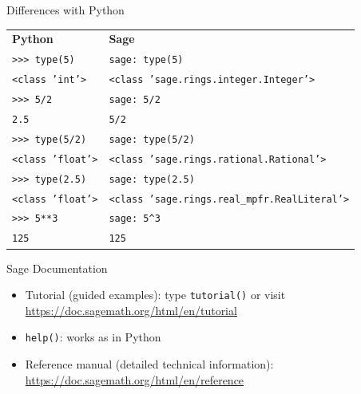 \documentclass[11pt]{beamer}
\begin{document}
\begin{frame}{Differences with Python}
  \begin{tabular}{l|l}
    \textbf{Python} & \textbf{Sage}                                          \\
    \texttt{{\color{gray}>>>} {\color{blue}type(5)}} &
    \texttt{{\color{gray}sage:} {\color{blue}type(5)}}                       \\
    \texttt{<class 'int'>} & \texttt{<class 'sage.rings.integer.Integer'>}   \\
    \texttt{{\color{gray}>>>} {\color{blue}5/2}} &
    \texttt{{\color{gray}sage:} {\color{blue}5/2}}                           \\
    \texttt{2.5} & \texttt{5/2}                                              \\
    \texttt{{\color{gray}>>>} {\color{blue}type(5/2)}} &
    \texttt{{\color{gray}sage:} {\color{blue}type(5/2)}}                     \\
    \texttt{<class 'float'>} &
    \texttt{<class 'sage.rings.rational.Rational'>}                          \\
    \texttt{{\color{gray}>>>} {\color{blue}type(2.5)}} &
    \texttt{{\color{gray}sage:} {\color{blue}type(2.5)}}                     \\
    \texttt{<class 'float'>} &
    \texttt{<class 'sage.rings.real\_mpfr.RealLiteral'>}                     \\
    \texttt{{\color{gray}>>>} {\color{blue}5**3}} &
    \texttt{{\color{gray}sage:} {\color{blue}5\^{}3}}                        \\
    \texttt{125} & \texttt{125}
  \end{tabular}
\end{frame}

\begin{frame}{Sage Documentation}
  \begin{itemize}
    \item Tutorial (guided examples): type \texttt{tutorial()} or visit
          \url{https://doc.sagemath.org/html/en/tutorial}
    \item \texttt{help()}: works as in Python
    \item Reference manual (detailed technical information):
          \url{https://doc.sagemath.org/html/en/reference}
  \end{itemize}
\end{frame}
\end{document}
